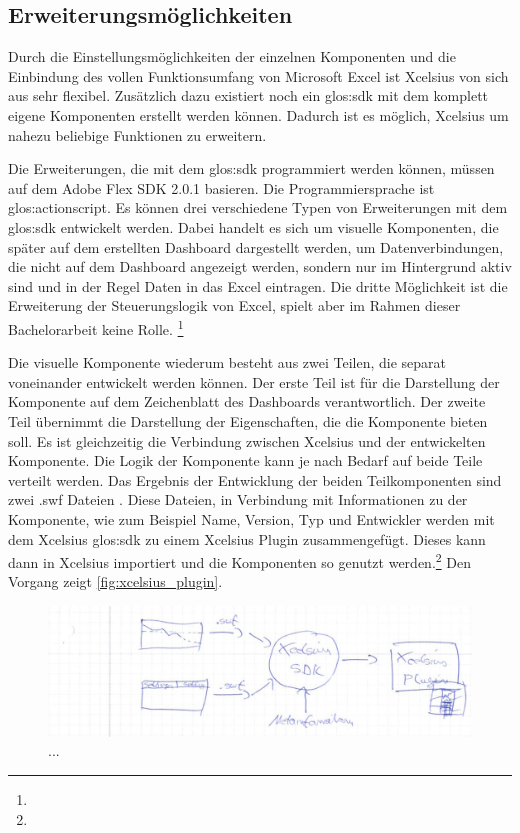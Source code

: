 \begin{onehalfspacing}

\subsection{Erweiterungsmöglichkeiten}

Durch die Einstellungsmöglichkeiten der einzelnen Komponenten und die Einbindung des vollen Funktionsumfang von Microsoft Excel ist \gls{Xcelsius} von sich aus sehr flexibel. Zusätzlich dazu existiert noch ein \gls{glos:sdk} mit dem komplett eigene Komponenten erstellt werden können. Dadurch ist es möglich, \gls{Xcelsius} um nahezu beliebige Funktionen zu erweitern.

Die Erweiterungen, die mit dem \gls{glos:sdk} programmiert werden können, müssen auf dem Adobe Flex SDK 2.0.1 basieren. Die Programmiersprache ist \gls{glos:actionscript}. Es können drei verschiedene Typen von Erweiterungen mit dem \gls{glos:sdk} entwickelt werden. Dabei handelt es sich um visuelle Komponenten, die später auf dem erstellten Dashboard dargestellt werden, um Datenverbindungen, die nicht auf dem Dashboard angezeigt werden, sondern nur im Hintergrund aktiv sind und in der Regel Daten in das Excel eintragen. Die dritte Möglichkeit ist die Erweiterung der Steuerungslogik von Excel, spielt aber im Rahmen dieser Bachelorarbeit keine Rolle. \footnote{ }

Die visuelle Komponente wiederum besteht aus zwei Teilen, die separat voneinander entwickelt werden können. Der erste Teil ist für die Darstellung der Komponente auf dem Zeichenblatt des Dashboards verantwortlich. Der zweite Teil übernimmt die Darstellung der Eigenschaften, die die Komponente bieten soll. Es ist gleichzeitig die Verbindung zwischen \gls{Xcelsius} und der entwickelten Komponente. Die Logik der Komponente kann je nach Bedarf auf beide Teile verteilt werden. Das Ergebnis der Entwicklung der beiden Teilkomponenten sind zwei .swf Dateien . Diese Dateien, in Verbindung mit Informationen zu der Komponente, wie zum Beispiel Name, Version, Typ und Entwickler werden mit dem \gls{Xcelsius} \gls{glos:sdk} zu einem \gls{Xcelsius} Plugin zusammengefügt. Dieses kann dann in \gls{Xcelsius} importiert und die Komponenten so genutzt werden.\footnote{ } Den Vorgang zeigt \vref{fig:xcelsius_plugin}.

\begin{figure}[h]
\centering
\setlength{\unitlength}{1mm}
\includegraphics[width=15cm]{images/Xcelsius_Plugin_Allgemein.jpg}
\caption{...\label{fig:xcelsius_plugin}}
\end{figure}  


\end{onehalfspacing}
